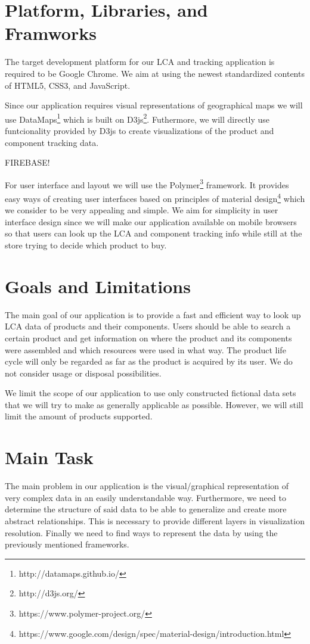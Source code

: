 \documentclass[a4page]{article}
\begin{document}
\section{Platform, Libraries, and Framworks}
The target development platform for our \ac{LCA} and tracking application is required to be Google Chrome. 
We aim at using the newest standardized contents of HTML5, CSS3, and JavaScript.

Since our application requires visual representations of geographical maps we will use DataMaps\footnote{http://datamaps.github.io/} which is built on D3js\footnote{http://d3js.org/}.
Futhermore, we will directly use funtcionality provided by D3js to create visualizations of the product and component tracking data.

FIREBASE!

For user interface and layout we will use the Polymer\footnote{https://www.polymer-project.org/} framework. 
It provides easy ways of creating user interfaces based on principles of material design\footnote{https://www.google.com/design/spec/material-design/introduction.html} which we consider to be very appealing and simple.
We aim for simplicity in user interface design since we will make our application available on mobile browsers so that users can look up the \ac{LCA} and component tracking info while still at the store trying to decide which product to buy.

\section{Goals and Limitations}
The main goal of our application is to provide a fast and efficient way to look up \ac{LCA} data of products and their components.
Users should be able to search a certain product and get information on where the product and its components were assembled and which resources were used in what way.
The product life cycle will only be regarded as far as the product is acquired by its user.
We do not consider usage or disposal possibilities. 


We limit the scope of our application to use only constructed fictional data sets that we will try to make as generally applicable as possible. However, we will still limit the amount of products supported.

\section{Main Task}
The main problem in our application is the visual/graphical representation of very complex data in an easily understandable way.
Furthermore, we need to determine the structure of said data to be able to generalize and create more abstract relationships.
This is necessary to provide different layers in visualization resolution.
Finally we need to find ways to represent the data by using the previously mentioned frameworks.
\end{document}
